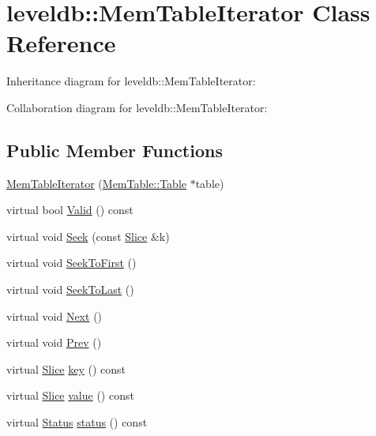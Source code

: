 \hypertarget{classleveldb_1_1_mem_table_iterator}{}\section{leveldb\+:\+:Mem\+Table\+Iterator Class Reference}
\label{classleveldb_1_1_mem_table_iterator}


Inheritance diagram for leveldb\+:\+:Mem\+Table\+Iterator\+:


Collaboration diagram for leveldb\+:\+:Mem\+Table\+Iterator\+:
\subsection*{Public Member Functions}
\begin{DoxyCompactItemize}
\item 
\hyperlink{classleveldb_1_1_mem_table_iterator_a3cf243a6e8166d55ce87081f69a5ecd7}{Mem\+Table\+Iterator} (\hyperlink{classleveldb_1_1_skip_list}{Mem\+Table\+::\+Table} $\ast$table)
\item 
virtual bool \hyperlink{classleveldb_1_1_mem_table_iterator_a95a8909aa37acb52f85a88c97329fa11}{Valid} () const 
\item 
virtual void \hyperlink{classleveldb_1_1_mem_table_iterator_a140f9575286994337de9b49ea7fe62cb}{Seek} (const \hyperlink{classleveldb_1_1_slice}{Slice} \&k)
\item 
virtual void \hyperlink{classleveldb_1_1_mem_table_iterator_a72eaf5c1bcb6d513f71d4edcb8db3f98}{Seek\+To\+First} ()
\item 
virtual void \hyperlink{classleveldb_1_1_mem_table_iterator_aaed044dc887a51c924086f2a2844a5f0}{Seek\+To\+Last} ()
\item 
virtual void \hyperlink{classleveldb_1_1_mem_table_iterator_a8ce5457cf61b989ce1ceec80084f891c}{Next} ()
\item 
virtual void \hyperlink{classleveldb_1_1_mem_table_iterator_a61f8a385b268158a1e7bd0cba29a83c1}{Prev} ()
\item 
virtual \hyperlink{classleveldb_1_1_slice}{Slice} \hyperlink{classleveldb_1_1_mem_table_iterator_a3e9b1c478d4ba8747dae4c8acb77a289}{key} () const 
\item 
virtual \hyperlink{classleveldb_1_1_slice}{Slice} \hyperlink{classleveldb_1_1_mem_table_iterator_a5910c8d44980cdec2d8ba603aabb98b8}{value} () const 
\item 
virtual \hyperlink{classleveldb_1_1_status}{Status} \hyperlink{classleveldb_1_1_mem_table_iterator_a1669aab641ff394968c30581a6b63f2a}{status} () const 
\end{DoxyCompactItemize}
